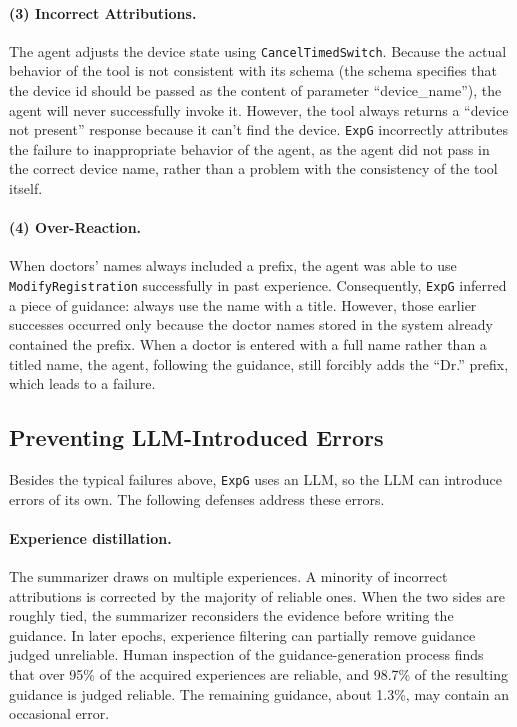 \documentclass[11pt]{article}
\newcommand{\ours}{\texttt{ExpG}}
\begin{document}
\paragraph{(3) Incorrect Attributions.}
The agent adjusts the device state using \texttt{CancelTimedSwitch}. Because the actual behavior of the tool is not consistent with its schema (the schema specifies that the device id should be passed as the content of parameter ``device\_name''), the agent will never successfully invoke it. However, the tool always returns a ``device not present'' response because it can't find the device. {\ours} incorrectly attributes the failure to inappropriate behavior of the agent, as the agent did not pass in the correct device name, rather than a problem with the consistency of the tool itself.

\paragraph{(4) Over-Reaction.}
When doctors' names always included a prefix, the agent was able to use \texttt{ModifyRegistration} successfully in past experience. Consequently, {\ours} inferred a piece of guidance: always use the name with a title. However, those earlier successes occurred only because the doctor names stored in the system already contained the prefix. When a doctor is entered with a full name rather than a titled name, the agent, following the guidance, still forcibly adds the ``Dr.'' prefix, which leads to a failure.


\subsection{Preventing LLM-Introduced Errors}
Besides the typical failures above, {\ours} uses an LLM, so the LLM can introduce errors of its own. The following defenses address these errors.


\paragraph{Experience distillation.}
The summarizer draws on multiple experiences. A minority of incorrect attributions is corrected by the majority of reliable ones. When the two sides are roughly tied, the summarizer reconsiders the evidence before writing the guidance. In later epochs, experience filtering can partially remove guidance judged unreliable. Human inspection of the guidance-generation process finds that over 95\% of the acquired experiences are reliable, and 98.7\% of the resulting guidance is judged reliable. The remaining guidance, about 1.3\%, may contain an occasional error.
\end{document}
